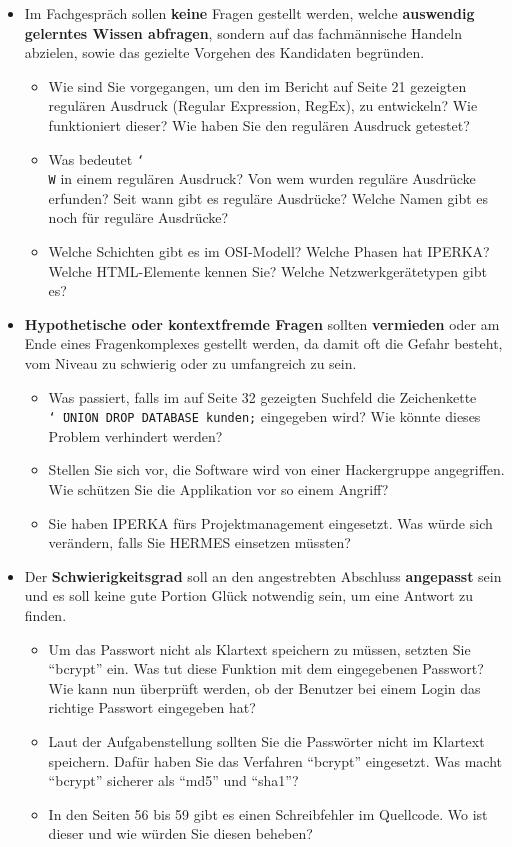 \begin{itemize}
  \item Im Fachgespräch sollen \textbf{keine} Fragen gestellt werden, welche \textbf{auswendig gelerntes Wissen abfragen}, sondern auf das fachmännische Handeln abzielen, sowie das gezielte Vorgehen des Kandidaten begründen.
  \begin{itemize}
    \item[\ding{51}] Wie sind Sie vorgegangen, um den im Bericht auf Seite 21 gezeigten regulären Ausdruck (Regular Expression, RegEx), zu entwickeln? Wie funktioniert dieser? Wie haben Sie den regulären Ausdruck getestet?
    \item[\ding{55}] Was bedeutet \texttt{\char`\\W} in einem regulären Ausdruck? Von wem wurden reguläre Ausdrücke erfunden? Seit wann gibt es reguläre Ausdrücke? Welche Namen gibt es noch für reguläre Ausdrücke?
    \item[\ding{55}] Welche Schichten gibt es im OSI-Modell? Welche Phasen hat IPERKA? Welche HTML-Elemente kennen Sie? Welche Netzwerkgerätetypen gibt es?
  \end{itemize}
  \item \textbf{Hypothetische oder kontextfremde Fragen} sollten \textbf{vermieden} oder am Ende eines Fragenkomplexes gestellt werden, da damit oft die Gefahr besteht, vom Niveau zu schwierig oder zu umfangreich zu sein.
  \begin{itemize}
    \item[\ding{51}] Was passiert, falls im auf Seite 32 gezeigten Suchfeld die Zeichenkette \texttt{\char`\"\ UNION DROP DATABASE kunden;} eingegeben wird? Wie könnte dieses Problem verhindert werden?
    \item[\ding{55}] Stellen Sie sich vor, die Software wird von einer Hackergruppe angegriffen. Wie schützen Sie die Applikation vor so einem Angriff?
    \item[\ding{55}] Sie haben IPERKA fürs Projektmanagement eingesetzt. Was würde sich verändern, falls Sie HERMES einsetzen müssten? 
  \end{itemize}
  \item Der \textbf{Schwierigkeitsgrad} soll an den angestrebten Abschluss \textbf{angepasst} sein und es soll keine gute Portion Glück notwendig sein, um eine Antwort zu finden.
  \begin{itemize}
    \item[\ding{51}] Um das Passwort nicht als Klartext speichern zu müssen, setzten Sie \enquote{bcrypt} ein. Was tut diese Funktion mit dem eingegebenen Passwort? Wie kann nun überprüft werden, ob der Benutzer bei einem Login das richtige Passwort eingegeben hat?
    \item[\ding{55}] Laut der Aufgabenstellung sollten Sie die Passwörter nicht im Klartext speichern. Dafür haben Sie das Verfahren \enquote{bcrypt} eingesetzt. Was macht \enquote{bcrypt} sicherer als \enquote{md5} und \enquote{sha1}?
    \item[\ding{55}] In den Seiten 56 bis 59 gibt es einen Schreibfehler im Quellcode. Wo ist dieser und wie würden Sie diesen beheben?
  \end{itemize}
\end{itemize}